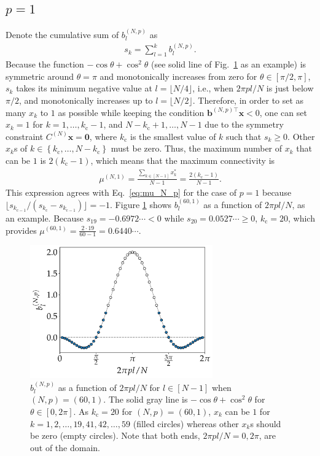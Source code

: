\subsection{$p=1$}
\label{subsec:p_1}
Denote the cumulative sum of $b^{(N,p)}_{l}$ as
\begin{align}
    s_{k} = \sum_{l=1}^{k}b^{(N,p)}_{l}.
\end{align}
Because the function $-\cos\theta+\cos^{2}\theta$ (see solid line of Fig.~\ref{fig:N60p1} as an example) is symmetric around $\theta=\pi$ and monotonically increases from zero for $\theta\in[\pi/2,\pi]$, $s_{k}$ takes its minimum negative value at $l=\lfloor N/4 \rfloor$, i.e., when $2\pi p l/N$ is just below $\pi/2$, and monotonically increases up to $l=\lfloor N/2\rfloor$. Therefore, in order to set as many $x_{k}$ to $1$ as possible while keeping the condition $\bm{b}^{(N,p) \top}\bm{x}<0$, one can set $x_{k}=1$ for $k=1,\dots,k_{\mathrm{c}}-1$, and $N-k_{\mathrm{c}}+1,\dots,N-1$ due to the symmetry constraint $C^{(N)}\bm{x}=\bm{0}$, where $k_{\mathrm{c}}$ is the smallest value of $k$ such that $s_{k}\geq0$. Other $x_{k}$s of $k\in\left\{k_{\mathrm{c}},\dots,N-k_{\mathrm{c}}\right\}$ must be zero. Thus, the maximum number of $x_{k}$ that can be $1$ is $2(k_{\mathrm{c}}-1)$, which means that the maximum connectivity is
\begin{align}
    \mu^{(N,1)}=\frac{\sum_{k\in[N-1]}x^{\ast}_{k}}{N-1}=\frac{2(k_{\mathrm{c}}-1)}{N-1}.
\end{align}
This expression agrees with Eq.~\eqref{eq:mu_N_p} for the case of $p=1$ because $\lfloor s_{k_{\mathrm{c}-1}}/(s_{k_{\mathrm{c}}}-s_{k_{\mathrm{c}-1}})\rfloor=-1$. Figure \ref{fig:N60p1} shows $b^{(60,1)}_{l}$ as a function of $2\pi p l/N$, as an example. Because $s_{19}=-0.6972\cdots<0$ while $s_{20}=0.0527\cdots\geq0$, $k_{\mathrm{c}}=20$, which provides $\mu^{(60,1)}=\frac{2\cdot 19}{60-1}=0.6440\cdots$.

\begin{figure}[!t]
    \centering
    \includegraphics[width=0.7\textwidth]{figs/N60p1.pdf}
    \caption{
        $b^{(N,p)}_{l}$ as a function of $2\pi p l/N$
        for $l\in[N-1]$ when $(N,p)=(60,1)$.
        The solid gray line is $-\cos\theta+\cos^{2}\theta$ for $\theta\in[0,2\pi]$.
        As $k_{\mathrm{c}}=20$ for $(N,p)=(60,1)$,
        $x_{k}$ can be $1$ for $k=1,2,\dots,19,41,42,\dots,59$ (filled circles) whereas other $x_{k}$s should be zero (empty circles). Note that both ends, $2\pi p l/N=0, 2\pi$, are out of the domain.
    }
    \label{fig:N60p1}
\end{figure}

